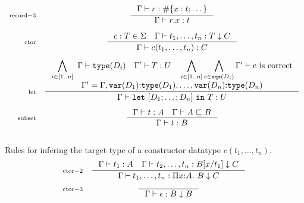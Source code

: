 \documentclass{article}
\newcommand{\rectyp}[1]{\#\{#1\}}
\newcommand{\fn}[1]{\mathtt{#1}}
\newcommand{\rctor}[3]{{#1} : {#2} \downarrow {#3}}
\newcommand{\Piexpr}[3]{\Pi {#1}{:}{#2}.\ {#3}}
\newcommand{\letexpr}[2]{\fn{let}\ {#1}\ \fn{in}\ {#2}}
\newcommand{\rlbl}[1]{\mathrm{\scriptstyle{}#1}}
\begin{document}
\begin{gather*}
\begin{array}{rc}
\rlbl{record-3}&
\inference{\Gamma |- r : \rectyp{ x : t; \dots }}
          {\Gamma |- r.x : t }\\[1.5em]
\rlbl{ctor}&
\inference{c : T \in \Sigma \quad \Gamma |- \rctor{t_1,\dots,t_n}{T}{C}}
          {\Gamma |- c(t_1,\dots,t_n) : C}\\[1.5em]
\rlbl{let}&
\inference{\displaystyle
           \bigwedge_{i\in[1..n]}\ \Gamma |- \fn{type}(D_i)\quad
           \Gamma' |- T : U\quad
           \bigwedge_{i\in[1..n]} \bigwedge_{e \in \fn{eqs}(D_i)} \Gamma' |- e\text{ is correct}\\
           \Gamma' = \Gamma,\fn{var}(D_1){:}\fn{type}(D_1), \dots, \fn{var}(D_n){:}\fn{type}(D_n)}
          {\Gamma |- \letexpr{[D_1; \dots; D_n]}{T} : U}
\\[1.5em]
\rlbl{subset}&
\inference{\Gamma |- t : A \quad \Gamma |- A \sqsubseteq B}
          {\Gamma |- t : B}\\[1.5em]
\end{array}
\end{gather*}

Rules for infering the target type of a constructor datatype $c(t_1, \dots, t_n)$.
\begin{gather*}
\begin{array}{rc}
\rlbl{ctor-2}&
\inference{\Gamma|- t_1 : A \quad \Gamma |- \rctor{t_2,\dots,t_n}{B[x/t_1]}{C}}
          {\Gamma |- \rctor{t_1,\dots,t_n}{\Piexpr{x}{A}{B}}{C}}\\[1em]
\rlbl{ctor-3}&
\inference{}{\Gamma |- \rctor{\epsilon}{B}{B}}\\[1em]
\end{array}
\end{gather*}
\end{document}
